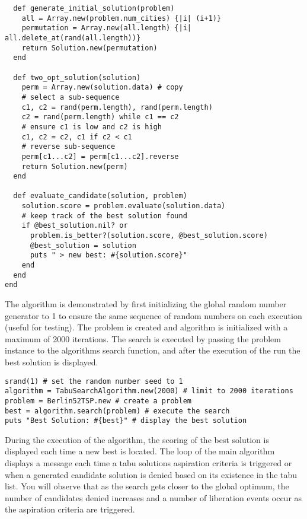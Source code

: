 \begin{lstlisting}
  def generate_initial_solution(problem)
    all = Array.new(problem.num_cities) {|i| (i+1)}
    permutation = Array.new(all.length) {|i| all.delete_at(rand(all.length))}
    return Solution.new(permutation)
  end

  def two_opt_solution(solution)
    perm = Array.new(solution.data) # copy
    # select a sub-sequence    
    c1, c2 = rand(perm.length), rand(perm.length)
    c2 = rand(perm.length) while c1 == c2
    # ensure c1 is low and c2 is high
    c1, c2 = c2, c1 if c2 < c1
    # reverse sub-sequence
    perm[c1...c2] = perm[c1...c2].reverse
    return Solution.new(perm)
  end

  def evaluate_candidate(solution, problem)
    solution.score = problem.evaluate(solution.data)
    # keep track of the best solution found
    if @best_solution.nil? or 
      problem.is_better?(solution.score, @best_solution.score)
      @best_solution = solution
      puts " > new best: #{solution.score}"               
    end
  end
end
\end{lstlisting}

The algorithm is demonstrated by first initializing the global random number generator to 1 to ensure the same sequence of random numbers on each execution (useful for testing). The problem is created and algorithm is initialized with a maximum of 2000 iterations. The search is executed by passing the problem instance to the algorithms search function, and after the execution of the run the best solution is displayed.

\begin{lstlisting}
srand(1) # set the random number seed to 1
algorithm = TabuSearchAlgorithm.new(2000) # limit to 2000 iterations 
problem = Berlin52TSP.new # create a problem
best = algorithm.search(problem) # execute the search
puts "Best Solution: #{best}" # display the best solution
\end{lstlisting}

During the execution of the algorithm, the scoring of the best solution is displayed each time a new best is located. The loop of the main algorithm displays a message each time a tabu solutions aspiration criteria is triggered or when a generated candidate solution is denied based on its existence in the tabu list. You will observe that as the search gets closer to the global optimum, the number of candidates denied increases and a number of liberation events occur as the aspiration criteria are triggered.

